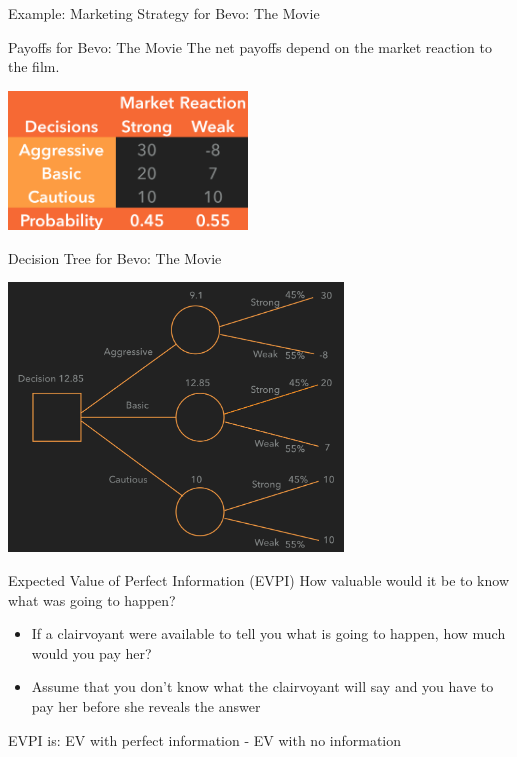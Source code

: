 \documentclass{beamer}\usepackage[]{graphicx}\usepackage[]{color}
\begin{document}
\begin{darkframes}
\begin{frame}[fragile]{Example: Marketing Strategy for Bevo: The Movie}
    \end{frame}



    \begin{frame}[fragile]{Payoffs for Bevo: The Movie}
      \fontsize{10}{10}\selectfont
      The net payoffs depend on the market reaction to the film.

        \begin{center}
          \includegraphics[width=2.5in]{BevoPayoffs} 
        \end{center}
  
    \end{frame}


    \begin{frame}[fragile]{Decision Tree for Bevo: The Movie}

        \begin{center}
          \includegraphics[width=3.5in]{BevoDecisionTree} 
        \end{center}

      \lc %
    \end{frame}


    \begin{frame}[fragile]{Expected Value of Perfect Information (EVPI)}
        \fontsize{10}{10}\selectfont
        How valuable would it be to know what was going to happen?
          \begin{itemize} [<+->]
            \item If a clairvoyant were available to tell you what is going to happen, how much would you pay her?
            \item Assume that you don't know what the clairvoyant will say and you have to pay her before she reveals the answer
          \end{itemize}  
          \pause
          EVPI is: 
             EV with perfect information - EV with no information
    \end{frame}



\end{darkframes}
\end{document}
